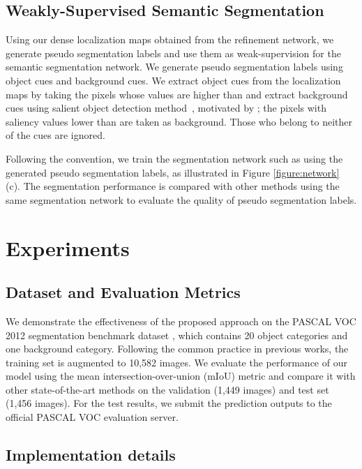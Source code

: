 \documentclass[letterpaper]{article} \usepackage{aaai21}  \usepackage{times}  \usepackage{helvet} \usepackage{courier}  \usepackage[hyphens]{url}  \usepackage{graphicx} \urlstyle{rm} \def\UrlFont{\rm}  \usepackage{natbib}  \usepackage{caption} \frenchspacing  \setlength{\pdfpagewidth}{8.5in}  \setlength{\pdfpageheight}{11in}
\begin{document}
\subsection{Weakly-Supervised Semantic Segmentation}
\label{method:4}
Using our dense localization maps obtained from the refinement network, we generate pseudo segmentation labels and use them as weak-supervision for the semantic segmentation network.
We generate pseudo segmentation labels using object cues and background cues.
We extract object cues from the localization maps by taking the pixels whose values are higher than  and extract background cues using salient object detection method~\cite{liu2019simple}, motivated by \cite{wei2017object, wei2018revisiting}; the pixels with saliency values lower than  are taken as background.
Those who belong to neither of the cues are ignored.
  
Following the convention, we train the segmentation network such as \cite{chen2014semantic, chen2017deeplab} using the generated pseudo segmentation labels, as illustrated in Figure \ref{figure:network} (c).
The segmentation performance is compared with other methods using the same segmentation network to evaluate the quality of pseudo segmentation labels.



\section{Experiments}

\subsection{Dataset and Evaluation Metrics}
    
We demonstrate the effectiveness of the proposed approach on the PASCAL VOC 2012 segmentation benchmark dataset \cite{Everingham2014ThePV}, which contains 20 object categories and one background category. 
Following the common practice in previous works, the training set is augmented to 10,582 images.
We evaluate the performance of our model using the mean intersection-over-union (mIoU) metric and compare it with other state-of-the-art methods on the validation (1,449 images) and test set (1,456 images).
For the test results, we submit the prediction outputs to the official PASCAL VOC evaluation server.


\subsection{Implementation details}
\end{document}
